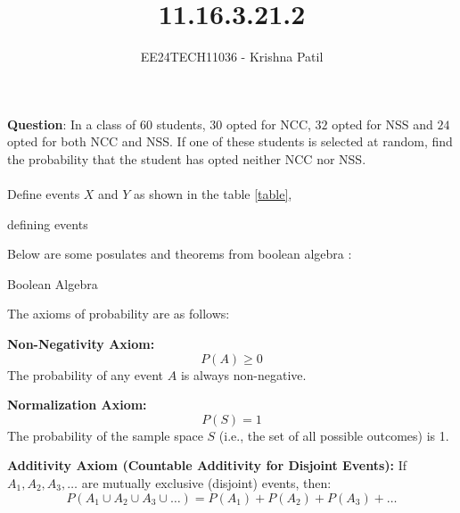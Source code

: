 \documentclass[journal]{IEEEtran}
\begin{document}

\vspace{3cm}

\title{11.16.3.21.2}
\author{EE24TECH11036 - Krishna Patil}
{\let\newpage\relax\maketitle}
\renewcommand{\thefigure}{\theenumi}
\renewcommand{\thetable}{\theenumi}
\setlength{\intextsep}{10pt} %


\textbf{Question}: In a class of $60$ students, $30$ opted for NCC, $32$ opted for NSS and $24$ opted for both NCC and NSS. If one of these students is selected at random, find the probability that the student has opted neither NCC nor NSS. \\ \\
\solution
Define events $X$ and $Y$ as shown in the table \ref{table}, \\
\begin{table}[h!]    
  \centering
  
  \caption{defining events}
  \label{table}
\end{table}
\newline Below are some posulates and theorems from boolean algebra : 
\begin{table}[h!]    
  \centering
  
  \caption{Boolean Algebra}
  \label{table2}
\end{table}
\newline The axioms of probability are as follows:

\textbf{Non-Negativity Axiom:}
\[
P(A) \geq 0
\]
The probability of any event \( A \) is always non-negative.

\textbf{Normalization Axiom:}
\[
P(S) = 1
\]
The probability of the sample space \( S \) (i.e., the set of all possible outcomes) is 1.

\textbf{Additivity Axiom (Countable Additivity for Disjoint Events):}  
If \( A_1, A_2, A_3, \dots \) are mutually exclusive (disjoint) events, then:
\[
P(A_1 \cup A_2 \cup A_3 \cup \dots) = P(A_1) + P(A_2) + P(A_3) + \dots
\]
\end{document}
